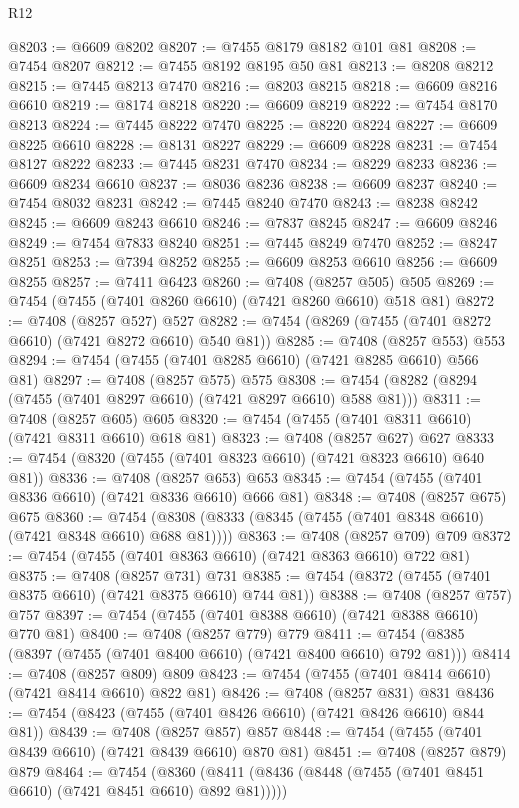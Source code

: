 \begin{lexlean}{R12}
\begin{coremodule}
{{{{{{{{{{{{{{{{{{{{{{{{{{{{{{{{{{{{{{{{{{{{{{{{{{{{{{{{{{{{{{{{{{{{{{{{{{{{{{{{{{@8203 := @6609 @8202
@8207 := @7455 @8179 @8182 @101 @81
@8208 := @7454 @8207
@8212 := @7455 @8192 @8195 @50 @81
@8213 := @8208 @8212
@8215 := @7445 @8213 @7470
@8216 := @8203 @8215
@8218 := @6609 @8216 @6610
@8219 := @8174 @8218
@8220 := @6609 @8219
@8222 := @7454 @8170 @8213
@8224 := @7445 @8222 @7470
@8225 := @8220 @8224
@8227 := @6609 @8225 @6610
@8228 := @8131 @8227
@8229 := @6609 @8228
@8231 := @7454 @8127 @8222
@8233 := @7445 @8231 @7470
@8234 := @8229 @8233
@8236 := @6609 @8234 @6610
@8237 := @8036 @8236
@8238 := @6609 @8237
@8240 := @7454 @8032 @8231
@8242 := @7445 @8240 @7470
@8243 := @8238 @8242
@8245 := @6609 @8243 @6610
@8246 := @7837 @8245
@8247 := @6609 @8246
@8249 := @7454 @7833 @8240
@8251 := @7445 @8249 @7470
@8252 := @8247 @8251
@8253 := @7394 @8252
@8255 := @6609 @8253 @6610
@8256 := @6609 @8255
@8257 := @7411 @6423
@8260 := @7408 (@8257 @505) @505
@8269 := @7454 (@7455 (@7401 @8260 @6610) (@7421 @8260 @6610) @518 @81)
@8272 := @7408 (@8257 @527) @527
@8282 := @7454 (@8269 (@7455 (@7401 @8272 @6610) (@7421 @8272 @6610) @540 @81))
@8285 := @7408 (@8257 @553) @553
@8294 := @7454 (@7455 (@7401 @8285 @6610) (@7421 @8285 @6610) @566 @81)
@8297 := @7408 (@8257 @575) @575
@8308 := @7454 (@8282 (@8294 (@7455 (@7401 @8297 @6610) (@7421 @8297 @6610) @588 @81)))
@8311 := @7408 (@8257 @605) @605
@8320 := @7454 (@7455 (@7401 @8311 @6610) (@7421 @8311 @6610) @618 @81)
@8323 := @7408 (@8257 @627) @627
@8333 := @7454 (@8320 (@7455 (@7401 @8323 @6610) (@7421 @8323 @6610) @640 @81))
@8336 := @7408 (@8257 @653) @653
@8345 := @7454 (@7455 (@7401 @8336 @6610) (@7421 @8336 @6610) @666 @81)
@8348 := @7408 (@8257 @675) @675
@8360 := @7454 (@8308 (@8333 (@8345 (@7455 (@7401 @8348 @6610) (@7421 @8348 @6610) @688 @81))))
@8363 := @7408 (@8257 @709) @709
@8372 := @7454 (@7455 (@7401 @8363 @6610) (@7421 @8363 @6610) @722 @81)
@8375 := @7408 (@8257 @731) @731
@8385 := @7454 (@8372 (@7455 (@7401 @8375 @6610) (@7421 @8375 @6610) @744 @81))
@8388 := @7408 (@8257 @757) @757
@8397 := @7454 (@7455 (@7401 @8388 @6610) (@7421 @8388 @6610) @770 @81)
@8400 := @7408 (@8257 @779) @779
@8411 := @7454 (@8385 (@8397 (@7455 (@7401 @8400 @6610) (@7421 @8400 @6610) @792 @81)))
@8414 := @7408 (@8257 @809) @809
@8423 := @7454 (@7455 (@7401 @8414 @6610) (@7421 @8414 @6610) @822 @81)
@8426 := @7408 (@8257 @831) @831
@8436 := @7454 (@8423 (@7455 (@7401 @8426 @6610) (@7421 @8426 @6610) @844 @81))
@8439 := @7408 (@8257 @857) @857
@8448 := @7454 (@7455 (@7401 @8439 @6610) (@7421 @8439 @6610) @870 @81)
@8451 := @7408 (@8257 @879) @879
@8464 := @7454
    (@8360 (@8411 (@8436 (@8448 (@7455 (@7401 @8451 @6610) (@7421 @8451 @6610) @892 @81)))))
}}}}}}}}}}}}}}}}}}}}}}}}}}}}}}}}}}}}}}}}}}}}}}}}}}}}}}}}}}}}}}}}}}}}}}}}}}}}}}}}}}
\end{coremodule}
\end{lexlean}
